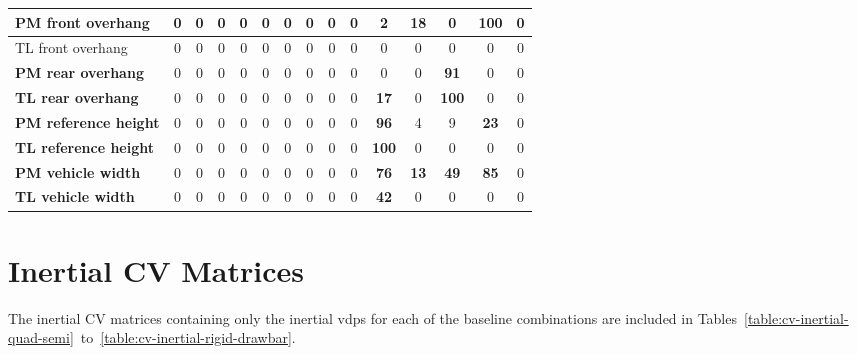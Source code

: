 \begin{table}[H]
\begin{tabular}{|l|c|c|c|c|c|c|c|c|c|c|c|c|c|c|}
\hline
\textcolor[rgb]{0.851, 0.373, 0.008}{\textbf{PM front overhang}} & 0 & 0 & 0 & 0 & 0 & 0 & 0 & 0 & 0 & 2 & \textbf{18} & 0 & \textcolor[rgb]{0.835, 0.369, 0.000}{\textbf{100}} & 0 \\
\hline
TL front overhang & 0 & 0 & 0 & 0 & 0 & 0 & 0 & 0 & 0 & 0 & 0 & 0 & 0 & 0 \\
\hline
\textcolor[rgb]{0.000, 0.447, 0.698}{\textbf{PM rear overhang}} & 0 & 0 & 0 & 0 & 0 & 0 & 0 & 0 & 0 & 0 & 0 & \textcolor[rgb]{0.000, 0.447, 0.698}{\textbf{91}} & 0 & 0 \\
\hline
\textcolor[rgb]{0.851, 0.373, 0.008}{\textbf{TL rear overhang}} & 0 & 0 & 0 & 0 & 0 & 0 & 0 & 0 & 0 & \textbf{17} & 0 & \textcolor[rgb]{0.835, 0.369, 0.000}{\textbf{100}} & 0 & 0 \\
\hline
\textcolor[rgb]{0.000, 0.447, 0.698}{\textbf{PM reference height}} & 0 & 0 & 0 & 0 & 0 & 0 & 0 & 0 & 0 & \textcolor[rgb]{0.000, 0.447, 0.698}{\textbf{96}} & 4 & 9 & \textbf{23} & 0 \\
\hline
\textcolor[rgb]{0.851, 0.373, 0.008}{\textbf{TL reference height}} & 0 & 0 & 0 & 0 & 0 & 0 & 0 & 0 & 0 & \textcolor[rgb]{0.835, 0.369, 0.000}{\textbf{100}} & 0 & 0 & 0 & 0 \\
\hline
\textcolor[rgb]{0.000, 0.447, 0.698}{\textbf{PM vehicle width}} & 0 & 0 & 0 & 0 & 0 & 0 & 0 & 0 & 0 & \textcolor[rgb]{0.000, 0.447, 0.698}{\textbf{76}} & \textbf{13} & \textcolor[rgb]{0.000, 0.620, 0.451}{\textbf{49}} & \textcolor[rgb]{0.000, 0.447, 0.698}{\textbf{85}} & 0 \\
\hline
\textcolor[rgb]{0.000, 0.620, 0.451}{\textbf{TL vehicle width}} & 0 & 0 & 0 & 0 & 0 & 0 & 0 & 0 & 0 & \textcolor[rgb]{0.000, 0.620, 0.451}{\textbf{42}} & 0 & 0 & 0 & 0 \\
\hline

\end{tabular}%
\end{table}%


\section{Inertial CV Matrices}\label{section:cv-inertial}

The inertial CV matrices containing only the inertial \glspl{vdp} for each of the baseline combinations are included in Tables~\ref{table:cv-inertial-quad-semi}~to~\ref{table:cv-inertial-rigid-drawbar}.

